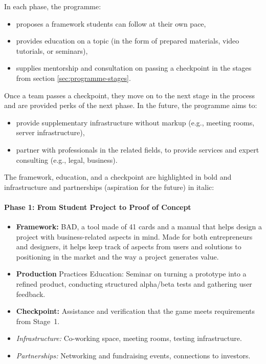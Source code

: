 In each phase, the programme:
\begin{itemize}
    \item proposes a framework students can follow at their own pace,
    \item provides education on a topic (in the form of prepared materials, video tutorials, or seminars),
    \item supplies mentorship and consultation on passing a checkpoint in the stages from section \ref{sec:programme-stages}.
\end{itemize}
Once a team passes a checkpoint, they move on to the next stage in the process and are provided perks of the next phase. In the future, the programme aims to:
\begin{itemize}
    \item provide supplementary infrastructure without markup (e.g., meeting rooms, server infrastructure),
    \item partner with professionals in the related fields, to provide services and expert consulting (e.g., legal, business).
\end{itemize}

The framework, education, and a checkpoint are highlighted in bold and infrastructure and partnerships (aspiration for the future) in italic:
\paragraph{\large Phase 1: From Student Project to Proof of Concept}
\begin{itemize}
    \item \textbf{Framework:} BAD, a tool made of 41 cards and a manual that helps design a project with business-related aspects in mind. Made for both entrepreneurs and designers, it helps keep track of aspects from users and solutions to positioning in the market and the way a project generates value. \cite{BAD}
    \item \textbf{Production }Practices Education: Seminar on turning a prototype into a refined product, conducting structured alpha/beta tests and gathering user feedback.
    \item \textbf{Checkpoint:} Assistance and verification that the game meets requirements from Stage~1.
    \item \textit{Infrastructure:} Co-working space, meeting rooms, testing infrastructure.
    \item \textit{Partnerships:} Networking and fundraising events, connections to investors.
\end{itemize}
